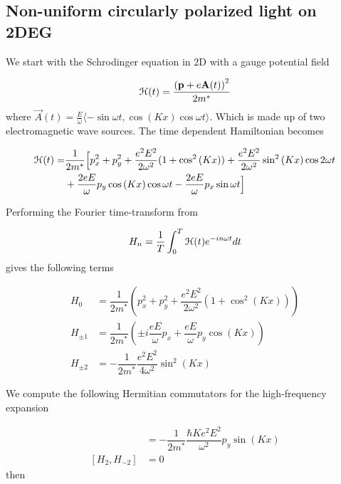 \subsection{Non-uniform circularly polarized light on 2DEG} \label{fll-2deg-derivation}

We start with the Schrodinger equation in 2D with a gauge potential field

\begin{equation}
  \mathcal{H}(t) = \dfrac{\left(\mathbf{p} + e\mathbf{A}(t) \right)^2}{2m^*}
\end{equation}
where $\vec{A}(t) = \tfrac{E}{\omega} \langle -\sin{\omega t} , \cos{(Kx)}\cos{\omega t} \rangle$.
Which is made up of two electromagnetic wave sources.
The time dependent Hamiltonian becomes

\begin{equation}
\begin{split}
  \mathcal{H}(t) = &\dfrac{1}{2m^*} \Big[ p_x^2 + p_y^2 + \dfrac{e^2 E^2}{2\omega^2}(1+\cos^2{(Kx)}) + \dfrac{e^2 E^2}{2\omega^2}\sin^2{(Kx)} \cos{2\omega t} \\
  &+ \dfrac{2eE}{\omega} p_y \cos{(Kx)} \cos{\omega t} - \dfrac{2eE}{\omega} p_x \sin{\omega t} \Big]
\end{split}
\end{equation}

Performing the Fourier time-transform from

\begin{equation}
  H_n = \dfrac{1}{T} \int_{0}^{T} \mathcal{H}(t) e^{-in\omega t} dt
\end{equation}
gives the following terms

\begin{align}
  H_0 &= \dfrac{1}{2m^*} \left( p_x^2 + p_y^2 + \dfrac{e^2 E^2}{2 \omega^2} (1+\cos^2{(Kx)}) \right) \\
  H_{\pm1} &= \dfrac{1}{2m^*} \left( \pm i \dfrac{eE}{\omega} p_x + \dfrac{eE}{\omega} p_y \cos{(Kx)} \right) \\
  H_{\pm2} &= -\dfrac{1}{2m^*} \dfrac{e^2 E^2}{4\omega^2} \sin^2{(Kx)}
\end{align}

We compute the following Hermitian commutators for the high-frequency expansion

\begin{align}
  [H_{1}, H_{-1}] &= -\dfrac{1}{2m^*} \dfrac{\hbar K e^2 E^2}{\omega^2} p_y \sin{(Kx)} \\
  [H_{2}, H_{-2}] &= 0
\end{align}
then

